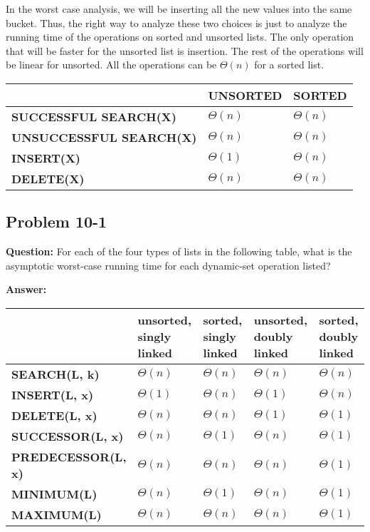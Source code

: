 \documentclass[]{book}
\theoremstyle{definition}
\begin{document}
In the worst case analysis, we will be inserting all the new values into the same bucket.
Thus, the right way to analyze these two choices is just to analyze the running time of
the operations on sorted and unsorted lists. The only operation that will be faster
for the unsorted list is insertion. The rest of the operations will be linear for unsorted.
All the operations can be $\Theta(n)$ for a sorted list.

\begin{table}[h]
\captionsetup{labelfont=it,justification=centering} 		%
\begin{tabular}{|l|l|l|} %
    \hline
    & \textbf{UNSORTED} & \textbf{SORTED}
    \tabularnewline\hline 
    \textbf{SUCCESSFUL SEARCH(X)}        & $\Theta(n)$ & $\Theta(n)$ 
    \tabularnewline\hline
    \textbf{UNSUCCESSFUL SEARCH(X)}      & $\Theta(n)$ & $\Theta(n)$ 
    \tabularnewline\hline
    \textbf{INSERT(X)}                   & $\Theta(1)$ & $\Theta(n)$
    \tabularnewline\hline
    \textbf{DELETE(X)}                   & $\Theta(n)$ & $\Theta(n)$
    \tabularnewline\hline
\end{tabular}
\end{table}

\subsection*{Problem 10-1}

\textbf{Question:} 
For each of the four types of lists in the following table, what is the asymptotic
worst-case running time for each dynamic-set operation listed?

\textbf{Answer:} 

\begin{table}[h]
\captionsetup{labelfont=it,justification=centering} 		%
\begin{tabular}{ | l | p{2cm} | p{2cm} | p{2cm} | p{2cm} | } %
    \hline
    & \textbf{unsorted, singly linked} & \textbf{sorted, singly linked} & \textbf{unsorted, doubly linked} & \textbf{sorted, doubly linked}
    \tabularnewline\hline
    \textbf{SEARCH(L, k)}      &$\Theta(n)$ & $\Theta(n)$ & $\Theta(n)$ & $\Theta(n)$
    \tabularnewline\hline
    \textbf{INSERT(L, x)}      &$\Theta(1)$ & $\Theta(n)$ & $\Theta(1)$ & $\Theta(n)$
    \tabularnewline\hline
    \textbf{DELETE(L, x)}      &$\Theta(n)$ & $\Theta(n)$ & $\Theta(1)$&$\Theta(1)$
    \tabularnewline\hline
    \textbf{SUCCESSOR(L, x)}   &$\Theta(n)$ & $\Theta(1)$ & $\Theta(n)$&$\Theta(1)$
    \tabularnewline\hline
    \textbf{PREDECESSOR(L, x)} &$\Theta(n)$ & $\Theta(n)$ & $\Theta(n)$&$\Theta(1)$
    \tabularnewline\hline
    \textbf{MINIMUM(L)}        &$\Theta(n)$ & $\Theta(1)$ & $\Theta(n)$&$\Theta(1)$
    \tabularnewline\hline
    \textbf{MAXIMUM(L)}        &$\Theta(n)$ & $\Theta(n)$ & $\Theta(n)$&$\Theta(1)$
    \tabularnewline\hline
\end{tabular}
\end{table}

\end{document}
